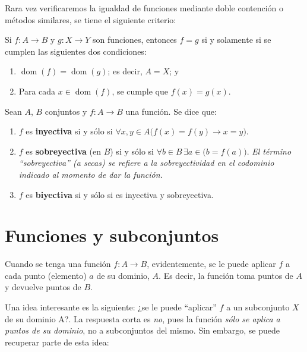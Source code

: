 \documentclass[letterpaper,DIV=14,headsepline,12pt]{scrartcl}
\DeclareMathOperator{\dom}{dom}
\begin{document}
    Rara vez verificaremos la igualdad de funciones mediante doble contención o métodos similares, se tiene el siguiente criterio:

    \begin{recordatorio}
        Si $f:A \to B$ y $g:X \to Y$ son funciones, entonces $f=g$ si y solamente si se cumplen las siguientes dos condiciones:
        \begin{enumerate}
            \item $\dom(f)=\dom(g)$; es decir, $A=X$; y
            \item Para cada $x \in \dom(f)$, se cumple que $f(x)=g(x)$.
        \end{enumerate}
    \end{recordatorio}

    \begin{definicion}
        Sean $A$, $B$ conjuntos y $f: A \to B$ una función. Se dice que:
        \begin{enumerate}
            \item $f$ es \textbf{inyectiva} si y sólo si $\forall x,y \in A \big( f(x)=f(y) \to x=y \big)$.
            \item $f$ es \textbf{sobreyectiva} (en $B$) si y sólo si $\forall b \in B \, \exists a \in \big( b=f(a) \big)$. \textit{El término ``sobreyectiva'' (a secas) se refiere a la sobreyectividad en el codominio indicado al momento de dar la función.}
            \item $f$ es \textbf{biyectiva} si y sólo si es inyectiva y sobreyectiva.
        \end{enumerate}
    \end{definicion}

    

    \section{Funciones y subconjuntos}

    Cuando se tenga una función $f:A \to B$, evidentemente, se le puede aplicar $f$ a cada punto (elemento) $a$ de su dominio, $A$. Es decir, la función toma puntos de $A$ y devuelve puntos de $B$.
    
    Una idea interesante es la siguiente: ¿se le puede ``aplicar'' $f$ a un subconjunto $X$ de su dominio A?. La respuesta corta es \textit{no}, pues la función \textit{sólo se aplica a puntos de su dominio}, no a subconjuntos del mismo. Sin embargo, se puede recuperar parte de esta idea:
\end{document}
